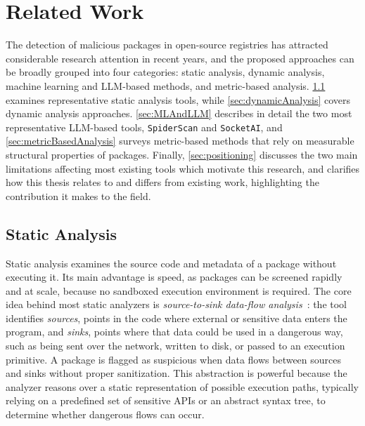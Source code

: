 \chapter{Related Work}
\label{ch:related}

The detection of malicious packages in open-source registries has attracted considerable research attention in recent years, 
and the proposed approaches can be broadly grouped into four categories: 
static analysis, dynamic analysis, machine learning and \ac{LLM}-based methods, and metric-based analysis.
\cref{sec:staticAnalysis} examines representative static analysis tools, 
while \cref{sec:dynamicAnalysis} covers dynamic analysis approaches. 
\cref{sec:MLAndLLM} describes in detail the two most representative \ac{LLM}-based tools, \texttt{SpiderScan} and \texttt{SocketAI}, 
and \cref{sec:metricBasedAnalysis} surveys metric-based methods that rely on measurable structural properties of packages.
Finally, \cref{sec:positioning} discusses the two main limitations affecting most existing tools which motivate this research, 
and clarifies how this thesis relates to and differs from existing work, highlighting the contribution it makes to the field.

\section{Static Analysis}
\label{sec:staticAnalysis}

Static analysis examines the source code and metadata of a package without executing it. 
Its main advantage is speed, as packages can be screened rapidly and at scale, 
because no sandboxed execution environment is required.
The core idea behind most static analyzers is \emph{source-to-sink data-flow analysis}~\cite{zahan2025leveraginglargelanguagemodels}: 
the tool identifies \emph{sources}, points in the code where external or sensitive data enters the program,
and \emph{sinks}, points where that data could be used in a dangerous way, 
such as being sent over the network, written to disk, or passed to an execution primitive.
A package is flagged as suspicious when data flows between sources and sinks without proper sanitization.
This abstraction is powerful because the analyzer reasons over a static representation of possible execution paths, 
typically relying on a predefined set of sensitive \acp{API} or an abstract syntax tree, to determine whether dangerous flows can occur.

